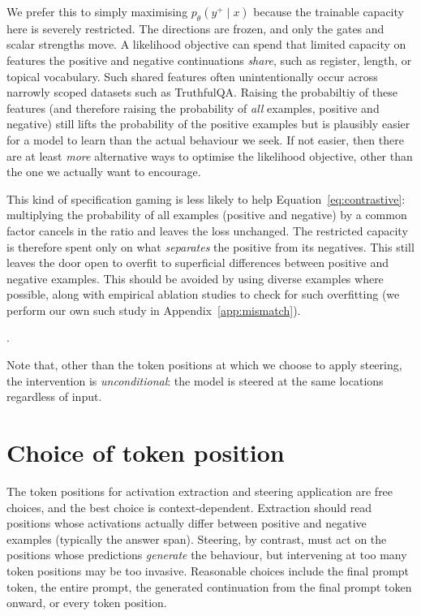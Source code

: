 \documentclass[logo,msc,notimes]{infthesis}
\newif\ifdraftnotes
\newcounter{todocount}
\newcommand{\todo}[1]{%
  \ifdraftnotes
    \stepcounter{todocount}%
    \addcontentsline{tdo}{todoitem}{\protect\numberline{\thetodocount}#1}%
    \textcolor{todored}{\textbf{[TODO~\thetodocount]}~#1}%
  \fi}
\begin{document}
We prefer this to simply maximising $p_\theta(y^{+}\mid{x})$ because the trainable capacity here
is severely restricted. The directions are frozen, and only the gates and scalar strengths move. A
likelihood objective can spend that limited capacity on features the positive and negative
continuations \emph{share}, such as register, length, or topical vocabulary. Such shared features often unintentionally occur across narrowly scoped datasets such as TruthfulQA. Raising the probabiltiy of these features (and therefore raising the probability of \emph{all} examples, positive and negative) still lifts the probability of the positive examples but is plausibly easier for a model to learn than the actual behaviour we seek. If not easier, then there are at least \emph{more} alternative ways to optimise the likelihood objective, other than the one we actually want to encourage. 

This kind of specification gaming \citep{krakovna2020specification} is less likely to help Equation~\ref{eq:contrastive}: multiplying the probability of all examples (positive and negative) by a common factor cancels in the ratio and leaves the loss unchanged. The restricted capacity is therefore spent only on what
\emph{separates} the positive from its negatives. This still leaves the door open to overfit to superficial differences between positive and negative examples. This should be avoided by using diverse examples where possible, along with empirical ablation studies to check for such overfitting (we perform our own such study in Appendix~\ref{app:mismatch}).

\todo{sentence or two about how contrastive objective \emph{matches} how the steering vectors are extracted. not sure how to word this. alternatively/possibly in addition include the sketch proof for the linear case that Ivan mentioned, although I still don't understand the reasoning behind it}.

Note that, other than the token positions at which we choose to apply steering, the intervention is \emph{unconditional}: the model is steered at the same locations regardless of input.

\section{Choice of token position}

The token positions for activation extraction and steering application are free choices, and the best choice is context-dependent.
Extraction should read positions whose activations actually differ between positive and negative
examples (typically the answer span). Steering, by contrast, must act on the positions whose
predictions \emph{generate} the behaviour, but intervening at too many token positions may be too invasive. Reasonable choices include the final prompt token, the entire prompt, the generated continuation from the final prompt token
onward, or every token position. 
\end{document}
